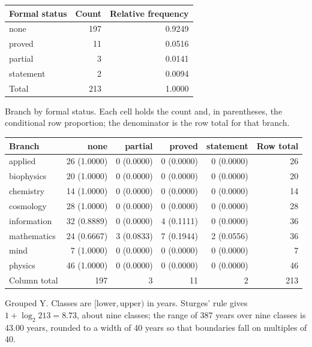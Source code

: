 \documentclass[11pt]{article}
\begin{document}
\begin{center}\begin{tabular}{lrr}
\toprule
Formal status & Count & Relative frequency \\
\midrule
none & 197 & 0.9249 \\
proved & 11 & 0.0516 \\
partial & 3 & 0.0141 \\
statement & 2 & 0.0094 \\
Total & 213 & 1.0000 \\
\bottomrule
\end{tabular}\end{center}

Branch by formal status. Each cell holds the count and, in parentheses, the conditional row proportion; the denominator is the row total for that branch.

\begin{center}\begin{tabular}{lrrrrr}
\toprule
Branch & none & partial & proved & statement & Row total \\
\midrule
applied & 26 (1.0000) & 0 (0.0000) & 0 (0.0000) & 0 (0.0000) & 26 \\
biophysics & 20 (1.0000) & 0 (0.0000) & 0 (0.0000) & 0 (0.0000) & 20 \\
chemistry & 14 (1.0000) & 0 (0.0000) & 0 (0.0000) & 0 (0.0000) & 14 \\
cosmology & 28 (1.0000) & 0 (0.0000) & 0 (0.0000) & 0 (0.0000) & 28 \\
information & 32 (0.8889) & 0 (0.0000) & 4 (0.1111) & 0 (0.0000) & 36 \\
mathematics & 24 (0.6667) & 3 (0.0833) & 7 (0.1944) & 2 (0.0556) & 36 \\
mind & 7 (1.0000) & 0 (0.0000) & 0 (0.0000) & 0 (0.0000) & 7 \\
physics & 46 (1.0000) & 0 (0.0000) & 0 (0.0000) & 0 (0.0000) & 46 \\
Column total & 197 & 3 & 11 & 2 & 213 \\
\bottomrule
\end{tabular}\end{center}

Grouped Y. Classes are $[\text{lower}, \text{upper})$ in years. Sturges' rule gives $1 + \log_2 213 = 8.73$, about nine classes; the range of 387 years over nine classes is 43.00 years, rounded to a width of 40 years so that boundaries fall on multiples of 40.
\end{document}
